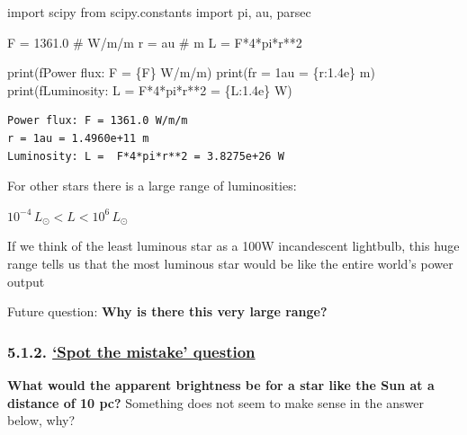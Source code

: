 \documentclass[
  letterpaper,
  DIV=11,
  numbers=noendperiod]{scrartcl}
\newenvironment{Shaded}{\begin{snugshade}}{\end{snugshade}}
\newcommand{\BuiltInTok}[1]{\textcolor[rgb]{0.00,0.23,0.31}{#1}}
\newcommand{\CommentTok}[1]{\textcolor[rgb]{0.37,0.37,0.37}{#1}}
\newcommand{\DecValTok}[1]{\textcolor[rgb]{0.68,0.00,0.00}{#1}}
\newcommand{\FloatTok}[1]{\textcolor[rgb]{0.68,0.00,0.00}{#1}}
\newcommand{\ImportTok}[1]{\textcolor[rgb]{0.00,0.46,0.62}{#1}}
\newcommand{\NormalTok}[1]{\textcolor[rgb]{0.00,0.23,0.31}{#1}}
\newcommand{\OperatorTok}[1]{\textcolor[rgb]{0.37,0.37,0.37}{#1}}
\newcommand{\SpecialCharTok}[1]{\textcolor[rgb]{0.37,0.37,0.37}{#1}}
\newcommand{\SpecialStringTok}[1]{\textcolor[rgb]{0.13,0.47,0.30}{#1}}
\begin{document}
\begin{Shaded}
\begin{Highlighting}[]
\ImportTok{import}\NormalTok{ scipy}
\ImportTok{from}\NormalTok{ scipy.constants }\ImportTok{import}\NormalTok{ pi, au, parsec}

\NormalTok{F }\OperatorTok{=} \FloatTok{1361.0} \CommentTok{\# W/m/m}
\NormalTok{r }\OperatorTok{=}\NormalTok{ au }\CommentTok{\# m}
\NormalTok{L }\OperatorTok{=}\NormalTok{ F}\OperatorTok{*}\DecValTok{4}\OperatorTok{*}\NormalTok{pi}\OperatorTok{*}\NormalTok{r}\OperatorTok{**}\DecValTok{2}

\BuiltInTok{print}\NormalTok{(}\SpecialStringTok{f\textquotesingle{}Power flux: F = }\SpecialCharTok{\{}\NormalTok{F}\SpecialCharTok{\}}\SpecialStringTok{ W/m/m\textquotesingle{}}\NormalTok{)}
\BuiltInTok{print}\NormalTok{(}\SpecialStringTok{f\textquotesingle{}r = 1au = }\SpecialCharTok{\{}\NormalTok{r}\SpecialCharTok{:1.4e\}}\SpecialStringTok{ m\textquotesingle{}}\NormalTok{)}
\BuiltInTok{print}\NormalTok{(}\SpecialStringTok{f\textquotesingle{}Luminosity: L =  F*4*pi*r**2 = }\SpecialCharTok{\{}\NormalTok{L}\SpecialCharTok{:1.4e\}}\SpecialStringTok{ W\textquotesingle{}}\NormalTok{)}
\end{Highlighting}
\end{Shaded}

\begin{verbatim}
Power flux: F = 1361.0 W/m/m
r = 1au = 1.4960e+11 m
Luminosity: L =  F*4*pi*r**2 = 3.8275e+26 W
\end{verbatim}

For other stars there is a large range of luminosities:

\(10^{-4}\,L_\odot < L < 10^{6}\,L_\odot\)

If we think of the least luminous star as a 100W incandescent lightbulb,
this huge range tells us that the most luminous star would be like the
entire world's power output

Future question: \textbf{Why is there this very large range?}

\hypertarget{spot-the-mistake-question-1}{%
\subsubsection{\texorpdfstring{5.1.2. \protect\hyperlink{toc0_}{`Spot
the mistake'
question}}{5.1.2. `Spot the mistake' question}}\label{spot-the-mistake-question-1}}

\textbf{What would the apparent brightness be for a star like the Sun at
a distance of 10 pc?} Something does not seem to make sense in the
answer below, why?
\end{document}
